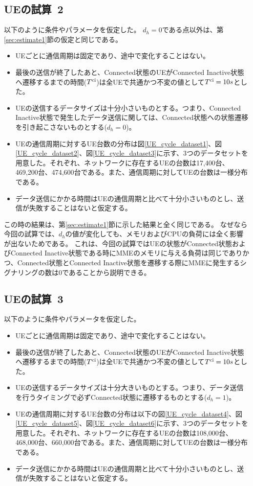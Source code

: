 \documentclass[a4j]{ujarticle}
\begin{document}
\subsection{UEの試算~2}
\label{sec:estimate2}
以下のように条件やパラメータを仮定した。
$d_h = 0$である点以外は、第\ref{sec:estimate1}節の仮定と同じである。
\begin{itemize}
  \item UEごとに通信周期は固定であり、途中で変化することはない。
  \item 最後の送信が終了したあと、Connected状態のUEがConnected Inactive状態へ遷移するまでの時間($T^{\rm ci}$)は全UEで共通かつ不変の値として$T^{\rm ci} = 10s$とした。
  \item UEの送信するデータサイズは十分小さいものとする。つまり、Connected Inactive状態で発生したデータ送信に関しては、Connected状態への状態遷移を引き起こさないものとする($d_h = 0$)。
  \item UEの通信周期に対するUE台数の分布は図\ref{UE_cycle_dataset1}、図\ref{UE_cycle_dataset2}、図\ref{UE_cycle_dataset3}に示す、3つのデータセットを用意した。それぞれ、ネットワークに存在するUEの台数は17,400台、469,200台、474,600台である。また、通信周期に対してUEの台数は一様分布である。
  \item データ送信にかかる時間はUEの通信周期と比べて十分小さいものとし、送信が失敗することはないと仮定する。
\end{itemize}

この時の結果は、第\ref{sec:estimate1}節に示した結果と全く同じである。
なぜなら今回の試算では、$d_h$の値が変化しても、メモリおよびCPUの負荷には全く影響が出ないためである。
これは、今回の試算ではUEの状態がConnected状態およびConnected Inactive状態である時にMMEのメモリに与える負荷は同じでありかつ、Connected状態とConnected Inactive状態を遷移する際にMMEに発生するシグナリングの数は0であることから説明できる。



\subsection{UEの試算~3}
\label{sec:estimate3}
以下のように条件やパラメータを仮定した。
\begin{itemize}
  \item UEごとに通信周期は固定であり、途中で変化することはない。
  \item 最後の送信が終了したあと、Connected状態のUEがConnected Inactive状態へ遷移するまでの時間($T^{\rm ci}$)は全UEで共通かつ不変の値として$T^{\rm ci} = 10s$とした。
  \item UEの送信するデータサイズは十分大きいものとする。つまり、データ送信を行うタイミングで必ずConnected状態に遷移するものとする($d_h = 1$)。
  \item UEの通信周期に対するUE台数の分布は以下の図\ref{UE_cycle_dataset4}、図\ref{UE_cycle_dataset5}、図\ref{UE_cycle_dataset6}に示す、3つのデータセットを用意した。それぞれ、ネットワークに存在するUEの台数は108,000台、468,000台、660,000台である。また、通信周期に対してUEの台数は一様分布である。
  \item データ送信にかかる時間はUEの通信周期と比べて十分小さいものとし、送信が失敗することはないと仮定する。
\end{itemize}
\end{document}
